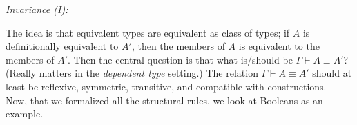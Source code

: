 \documentclass{article}
\begin{document}
{\it Invariance (I):} 
The idea is that equivalent types are equivalent as class of types; if $A$ is definitionally equivalent to $A'$, then the members of $A$ is equivalent to the members of $A'$. Then the central question is that what is/should be $\Gamma \vdash A \equiv A'$? (Really matters in the {\it dependent type} setting.)
The relation $\Gamma \vdash A \equiv A'$ should at least be reflexive, symmetric, transitive, and compatible with constructions.
\\

Now, that we formalized all the structural rules, we look at Booleans as an example.
\end{document}
